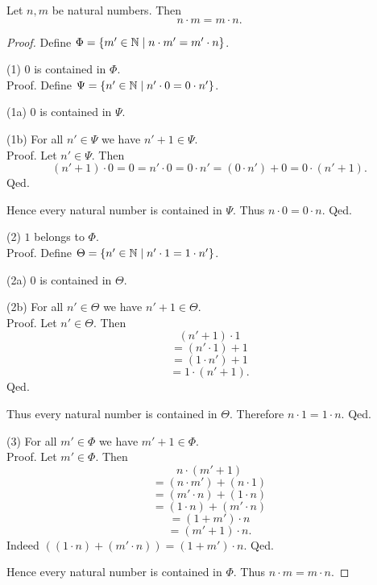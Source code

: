 \documentclass[../arithmetic.tex]{subfiles}
\begin{document}
  \begin{forthel}
    \begin{proposition}
      Let $n, m$ be natural numbers.
      Then \[ n \cdot m = m \cdot n. \]
    \end{proposition}
    \begin{proof}
      Define $\Phi = \{ m' \in \mathbb{N} \mid n \cdot m' = m' \cdot n \}$.

      (1) $0$ is contained in $\Phi$. \\
      Proof.
        Define $\Psi = \{ n' \in \mathbb{N} \mid n' \cdot 0 = 0 \cdot n' \}$.

        (1a) $0$ is contained in $\Psi$.

        (1b) For all $n' \in \Psi$ we have $n' \plus 1 \in \Psi$. \\
        Proof.
          Let $n' \in \Psi$.
          Then
          \[ (n' \plus 1) \cdot 0
            = 0
            = n' \cdot 0
            = 0 \cdot n'
            = (0 \cdot n') \plus 0
            = 0 \cdot (n' \plus 1). \]
        Qed.

        Hence every natural number is contained in $\Psi$.
        Thus $n \cdot 0 = 0 \cdot n$.
      Qed.

      (2) $1$ belongs to $\Phi$. \\
      Proof.
        Define $\Theta = \{ n' \in \mathbb{N} \mid n' \cdot 1 = 1 \cdot n' \}$.

        (2a) $0$ is contained in $\Theta$.

        (2b) For all $n' \in \Theta$ we have $n' \plus 1 \in \Theta$. \\
        Proof.
          Let $n' \in \Theta$.
          Then
          \[  (n' \plus 1) \cdot 1        \]
          \[    = (n' \cdot 1) \plus 1    \]
          \[    = (1 \cdot n') \plus 1    \]
          \[    = 1 \cdot (n' \plus 1).   \]
        Qed.

        Thus every natural number is contained in $\Theta$.
        Therefore $n \cdot 1 = 1 \cdot n$.
      Qed.

      (3) For all $m' \in \Phi$ we have $m' \plus 1 \in \Phi$. \\
      Proof.
        Let $m' \in \Phi$.
        Then
        \[  n \cdot (m' \plus 1)                \]
        \[    = (n \cdot m') \plus (n \cdot 1)  \]
        \[    = (m' \cdot n) \plus (1 \cdot n)  \]
        \[    = (1 \cdot n) \plus (m' \cdot n)  \]
        \[    = (1 \plus m') \cdot n            \]
        \[    = (m' \plus 1) \cdot n.           \]
        Indeed $((1 \cdot n) \plus (m' \cdot n)) = (1 \plus m') \cdot n$. %
      Qed.

      Hence every natural number is contained in $\Phi$.
      Thus $n \cdot m = m \cdot n$.
    \end{proof}
  \end{forthel}
\end{document}
